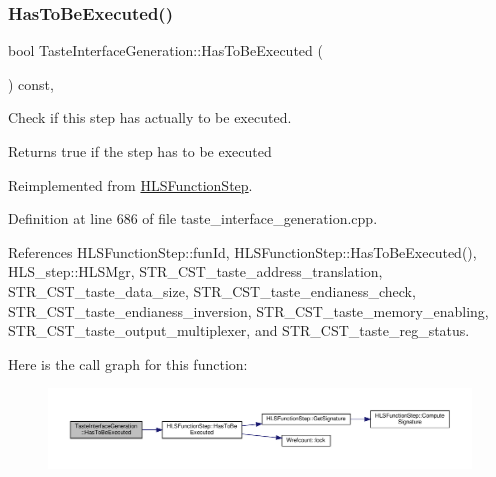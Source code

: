 \subsubsection{\texorpdfstring{Has\+To\+Be\+Executed()}{HasToBeExecuted()}}
{\footnotesize\ttfamily bool Taste\+Interface\+Generation\+::\+Has\+To\+Be\+Executed (\begin{DoxyParamCaption}{ }\end{DoxyParamCaption}) const\hspace{0.3cm}{\ttfamily [override]}, {\ttfamily [virtual]}}



Check if this step has actually to be executed. 

\begin{DoxyReturn}{Returns}
true if the step has to be executed 
\end{DoxyReturn}


Reimplemented from \hyperlink{classHLSFunctionStep_ac70d2df8fd475639bf9b5c8d492b2d62}{H\+L\+S\+Function\+Step}.



Definition at line 686 of file taste\+\_\+interface\+\_\+generation.\+cpp.



References H\+L\+S\+Function\+Step\+::fun\+Id, H\+L\+S\+Function\+Step\+::\+Has\+To\+Be\+Executed(), H\+L\+S\+\_\+step\+::\+H\+L\+S\+Mgr, S\+T\+R\+\_\+\+C\+S\+T\+\_\+taste\+\_\+address\+\_\+translation, S\+T\+R\+\_\+\+C\+S\+T\+\_\+taste\+\_\+data\+\_\+size, S\+T\+R\+\_\+\+C\+S\+T\+\_\+taste\+\_\+endianess\+\_\+check, S\+T\+R\+\_\+\+C\+S\+T\+\_\+taste\+\_\+endianess\+\_\+inversion, S\+T\+R\+\_\+\+C\+S\+T\+\_\+taste\+\_\+memory\+\_\+enabling, S\+T\+R\+\_\+\+C\+S\+T\+\_\+taste\+\_\+output\+\_\+multiplexer, and S\+T\+R\+\_\+\+C\+S\+T\+\_\+taste\+\_\+reg\+\_\+status.

Here is the call graph for this function\+:
\nopagebreak
\begin{figure}[H]
\begin{center}
\leavevmode
\includegraphics[width=350pt]{dc/d30/classTasteInterfaceGeneration_a3cfa566432fc5a45a50ef491a4ba83f6_cgraph}
\end{center}
\end{figure}
\mbox{\label{classTasteInterfaceGeneration_ae0e9b26f9d75ef90566c8b22071c7cf9}} 
